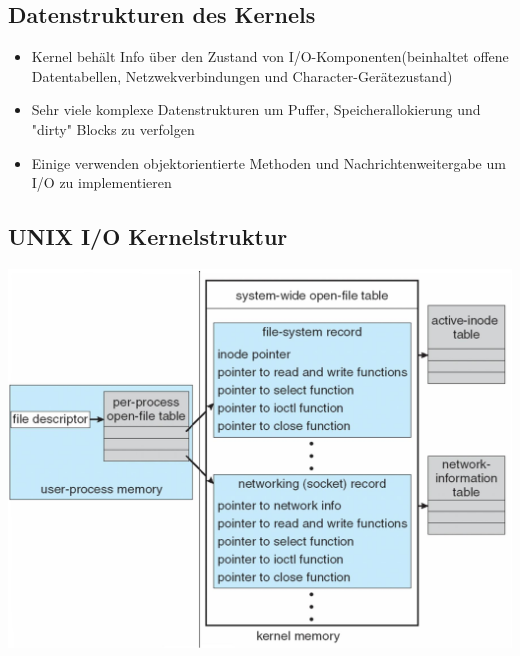 \documentclass[a4paper]{scrreprt}
\begin{document}
\subsection{Datenstrukturen des Kernels}
	\begin{itemize}
		\item Kernel behält Info über den Zustand von I/O-Komponenten(beinhaltet offene Datentabellen, Netzwekverbindungen und Character-Gerätezustand)
		\item Sehr viele komplexe Datenstrukturen um Puffer, Speicherallokierung und "dirty" Blocks zu verfolgen
		\item Einige verwenden objektorientierte Methoden und Nachrichtenweitergabe um I/O zu implementieren
	\end{itemize}
\subsection{UNIX I/O Kernelstruktur}
	\includegraphics[scale=0.32]{graphics/chapter9_11.png}

		
	
\end{document}
